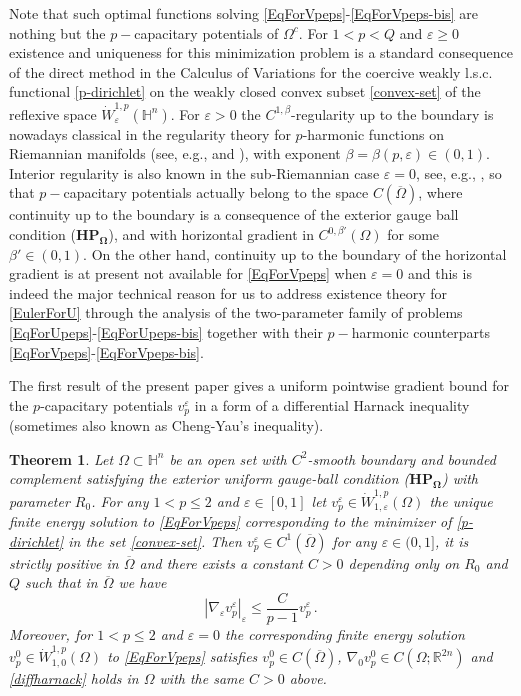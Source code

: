 \documentclass[10pt]{amsart}
\numberwithin{equation}{section}
\newtheorem{theorem}{Theorem}[section]
\theoremstyle{definition}
\newcommand{\He}{\mathbb{H}}
\begin{document}
Note that such optimal functions solving \eqref{EqForVpeps}-\eqref{EqForVpeps-bis} are nothing but the $p-$capacitary potentials of $ \Omega^c$. For $1<p<Q$ and $\varepsilon \geq 0$ existence and uniqueness for this minimization problem is a standard consequence of the direct method in the Calculus of Variations for the coercive weakly l.s.c. functional \eqref{p-dirichlet} on the weakly closed convex subset \eqref{convex-set} of the reflexive space $\dot{W}_{\varepsilon}^{1,p}(\mathbb{H}^n)$. For $\varepsilon>0$ the $C^{1,\beta}$-regularity up to the boundary is nowadays classical in the regularity theory for $p$-harmonic functions on Riemannian manifolds (see, e.g., \cite{Dibenedetto} and \cite{Lieberman}), with exponent $\beta=\beta(p,\varepsilon) \in (0,1)$. Interior regularity is also known in the sub-Riemannian case $\varepsilon=0$, see,  e.g., \cite{Zhong}, so that $p-$capacitary potentials actually belong to the space $C(\overline{\Omega})$, where continuity up to the boundary is a consequence of the exterior gauge ball condition ($\mathbf{HP_\Omega}$), and with horizontal gradient in $C^{0,\beta'}(\Omega)$ for some $\beta'\in (0,1)$. On the other hand,
continuity up to the boundary of the horizontal gradient is at present not available for \eqref{EqForVpeps} when $\varepsilon=0$ and this is indeed the major technical reason for us to address existence theory for \eqref{EulerForU} through the analysis of the two-parameter family of problems \eqref{EqForUpeps}-\eqref{EqForUpeps-bis} together with their $p-$harmonic counterparts \eqref{EqForVpeps}-\eqref{EqForVpeps-bis}.
\vskip5pt


The first result of the present paper gives a uniform pointwise gradient bound for the $p$-capacitary potentials $v^\varepsilon_p$ in a form of a differential Harnack inequality (sometimes also known as Cheng-Yau's inequality).
 
 \begin{theorem}
 \label{Thm:differential-harnack}
 Let $\Omega \subset \He^n$ be an open set with $C^2$-smooth boundary and bounded complement satisfying the exterior uniform gauge-ball condition ($\mathbf{HP_\Omega}$) with parameter $R_0$. For any $1<p\leq 2$ and $\varepsilon \in [0,1]$ let $v^\varepsilon_p \in \dot{W}^{1,p}_{1,\varepsilon}(\Omega)$ the unique finite energy solution to \eqref{EqForVpeps} corresponding to the minimizer of \eqref{p-dirichlet} in the set \eqref{convex-set}.
Then $v^\varepsilon_p \in C^1(\overline{\Omega})$ for any $\varepsilon \in (0,1]$, it is strictly positive in $\overline{\Omega}$ and there exists a constant $C>0$ depending only on $R_0$ and $Q$ such that   in $ \overline{\Omega}$ we have 
\begin{equation}
 \label{diffharnack}
 |\nabla_\varepsilon v^\varepsilon_p|_\varepsilon \leq \frac{C}{p-1}  v^\varepsilon_p  \, .
 \end{equation}
 Moreover, for $1<p\leq 2$ and $\varepsilon=0$  the corresponding finite energy solution $v^0_p  \in \dot{W}^{1,p}_{1,0}(\Omega)$  to \eqref{EqForVpeps} satisfies  $ v^0_p \in C(\overline{\Omega})$, $\nabla_0 v^0_p \in C(\Omega; \mathbb{R}^{2n})$ and \eqref{diffharnack} holds in $\Omega$ with the same $C>0$ above.
 \end{theorem}
 
\end{document}
